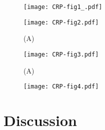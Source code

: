 \begin{figure}
	\centering
	\texttt{[image: CRP-fig1\_.pdf]}
	\clearpage %
	\label{fig:CRP:fig1-2}
\end{figure}	

\clearpage


\begin{figure}
	\centering
	\texttt{[image: CRP-fig2.pdf]}
	\caption{ 
		(A) 
	}
	\label{fig:CRP:fig2}
\end{figure}

\begin{figure}
	\centering
	\texttt{[image: CRP-fig3.pdf]}
	\caption{ 
		(A) 
	}
	\label{fig:CRP:fig3}
\end{figure}

\begin{figure}
	\centering
	\texttt{[image: CRP-fig4.pdf]}
	\clearpage %
	\label{fig:CRP:fig1-2}
\end{figure}	

\clearpage



\section{Discussion}


